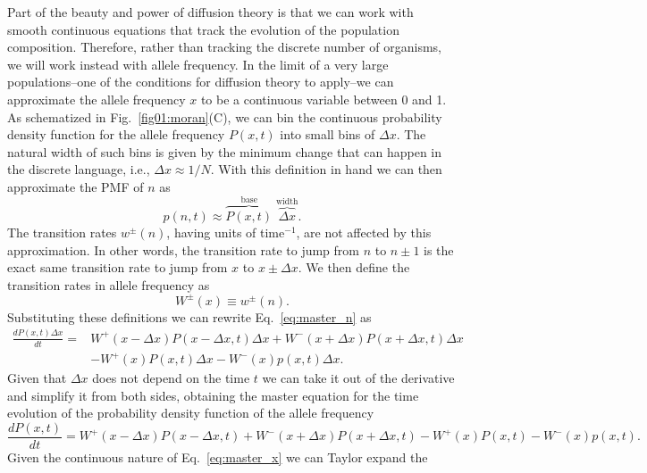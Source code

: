 Part of the beauty and power of diffusion theory is that we can work with smooth
continuous equations that track the evolution of the population composition.
Therefore, rather than tracking the discrete number of organisms, we will work
instead with allele frequency. In the limit of a very large populations--one of
the conditions for diffusion theory to apply--we can approximate the allele
frequency $x$ to be a continuous variable between 0 and 1. As schematized in
Fig.~\ref{fig01:moran}(C), we can bin the continuous probability density
function for the allele frequency $P(x, t)$ into small bins of $\Delta x$. The
natural width of such bins is given by the minimum change that can happen in the
discrete language, i.e., $\Delta x \approx 1 / N$. With this definition in hand
we can then approximate the PMF of $n$ as
\begin{equation}
  p(n, t) \approx
  \overbrace{P(x, t)}^{\text{base}} \;
  \overbrace{\Delta x}^{\text{width}}.
\end{equation}
The transition rates $w^\pm(n)$, having units of time$^{-1}$, are not affected
by this approximation. In other words, the transition rate to jump from $n$ to
$n \pm 1$ is the exact same transition rate to jump from $x$ to $x \pm \Delta
x$. We then define the transition rates in allele frequency as
\begin{equation}
  W^\pm(x) \equiv w^\pm(n).
\end{equation}
Substituting these definitions we can rewrite Eq.~\ref{eq:master_n} as
\begin{equation}
\begin{split}
    \frac{dP(x, t) \Delta x}{dt} = 
    &W^+(x - \Delta x) P(x - \Delta x, t) \Delta x
    + W^-(x + \Delta x) P(x + \Delta x, t) \Delta x\\
    &- W^+(x) P(x, t) \Delta x
    - W^-(x) p(x, t) \Delta x.
\end{split}
\end{equation}
Given that $\Delta x$ does not depend on the time $t$ we can take it out of the
derivative and simplify it from both sides, obtaining the master equation for
the time evolution of the probability density function of the allele frequency
\begin{equation}
    \frac{dP(x, t)}{dt} = 
    W^+(x - \Delta x) P(x - \Delta x, t)
    + W^-(x + \Delta x) P(x + \Delta x, t)
    - W^+(x) P(x, t) 
    - W^-(x) p(x, t).
    \label{eq:master_x} 
\end{equation}
Given the continuous nature of Eq.~\ref{eq:master_x} we can Taylor expand the
